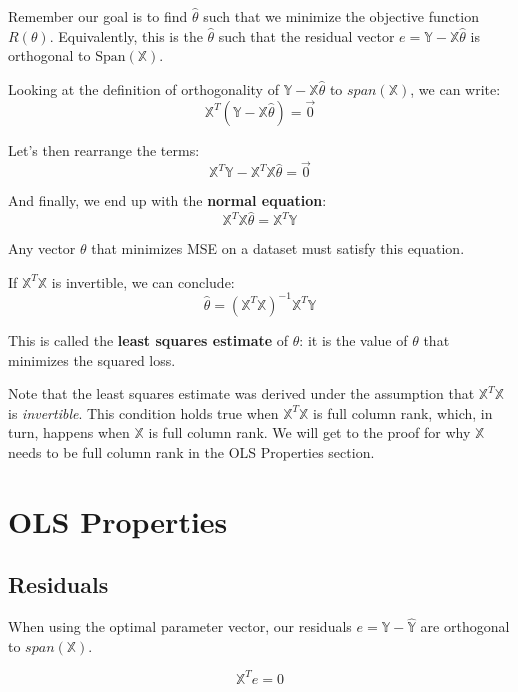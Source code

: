 \documentclass[
  letterpaper,
  DIV=11,
  numbers=noendperiod]{scrreprt}
\begin{document}
Remember our goal is to find \(\hat{\theta}\) such that we minimize the
objective function \(R(\theta)\). Equivalently, this is the
\(\hat{\theta}\) such that the residual vector
\(e = \mathbb{Y} - \mathbb{X} \hat{\theta}\) is orthogonal to
\(\text{Span}(\mathbb{X})\).

Looking at the definition of orthogonality of
\(\mathbb{Y} - \mathbb{X}\hat{\theta}\) to \(span(\mathbb{X})\), we can
write: \[\mathbb{X}^T (\mathbb{Y} - \mathbb{X}\hat{\theta}) = \vec{0}\]

Let's then rearrange the terms:
\[\mathbb{X}^T \mathbb{Y} - \mathbb{X}^T \mathbb{X} \hat{\theta} = \vec{0}\]

And finally, we end up with the \textbf{normal equation}:
\[\mathbb{X}^T \mathbb{X} \hat{\theta} = \mathbb{X}^T \mathbb{Y}\]

Any vector \(\theta\) that minimizes MSE on a dataset must satisfy this
equation.

If \(\mathbb{X}^T \mathbb{X}\) is invertible, we can conclude:
\[\hat{\theta} = (\mathbb{X}^T \mathbb{X})^{-1} \mathbb{X}^T \mathbb{Y}\]

This is called the \textbf{least squares estimate} of \(\theta\): it is
the value of \(\theta\) that minimizes the squared loss.

Note that the least squares estimate was derived under the assumption
that \(\mathbb{X}^T \mathbb{X}\) is \emph{invertible}. This condition
holds true when \(\mathbb{X}^T \mathbb{X}\) is full column rank, which,
in turn, happens when \(\mathbb{X}\) is full column rank. We will get to
the proof for why \(\mathbb{X}\) needs to be full column rank in the OLS
Properties section.

\section{OLS Properties}\label{ols-properties}

\subsection{Residuals}\label{residuals}

When using the optimal parameter vector, our residuals
\(e = \mathbb{Y} - \hat{\mathbb{Y}}\) are orthogonal to
\(span(\mathbb{X})\).

\[\mathbb{X}^Te = 0 \]
\end{document}
